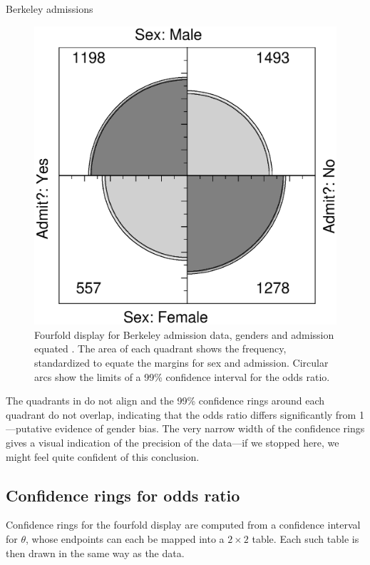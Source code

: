 \begin{Example}[berkeley2]{Berkeley admissions}
\begin{figure}[htb]
  \centering
  \includegraphics[scale=.6]{ch3/fig/fourfold13}
  \caption[Fourfold display for Berkeley admission data, genders and admission equated]{Fourfold display for Berkeley admission data, genders and admission equated%
. The area of each
quadrant shows the frequency, standardized to equate the margins for
sex and admission.  Circular arcs show the limits of a 99\% confidence
interval for the odds ratio.}\label{fig:fourfold13}
\end{figure}


The quadrants in  do not align and
the 99\% confidence rings around each quadrant do not overlap,
indicating that the odds ratio differs significantly from 1---putative
evidence of gender bias.  The very narrow
width of the confidence rings gives a visual indication of the
precision of the data---if we stopped here, we might feel quite confident of
this conclusion.
\end{Example}

\subsection{Confidence rings for odds ratio}
Confidence rings for the fourfold display are computed from a
confidence interval for \(\theta\), whose endpoints can each be
mapped into a \(2 \times  2\) table.  Each such table is then drawn
in the same way as the data.

